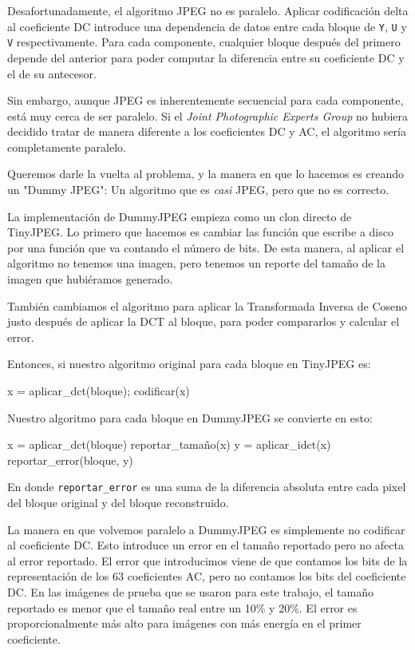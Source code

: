 Desafortunadamente, el algoritmo JPEG no es paralelo. Aplicar codificación
delta al coeficiente DC introduce una dependencia de datos entre cada bloque de
\verb+Y+, \verb+U+ y \verb+V+ respectivamente. Para cada componente, cualquier
bloque después del primero depende del anterior para poder computar la
diferencia entre su coeficiente DC  y el de su antecesor.

Sin embargo, aunque JPEG es inherentemente secuencial para cada componente,
está muy cerca de ser paralelo. Si el \emph{Joint Photographic Experts Group}
no hubiera decidido tratar de manera diferente a los coeficientes DC y AC, el
algoritmo sería completamente paralelo.

Queremos darle la vuelta al problema, y la manera en que lo hacemos es creando un "Dummy JPEG": Un algoritmo que es \emph{casi} JPEG, pero que no es correcto.

La implementación de DummyJPEG empieza como un clon directo de TinyJPEG. Lo
primero que hacemos es cambiar las función que escribe a disco por una función
que va contando el número de bits. De esta manera, al aplicar el algoritmo no
tenemos una imagen, pero tenemos un reporte del tamaño de la imagen que
hubiéramos generado.

También cambiamos el algoritmo para aplicar la Transformada Inversa de Coseno
justo después de aplicar la DCT al bloque, para poder compararlos y calcular el
error.

Entonces, si nuestro algoritmo original para cada bloque en TinyJPEG es:

\begin{code}
    x = aplicar_dct(bloque);
    codificar(x)
\end{code}

Nuestro algoritmo para cada bloque en DummyJPEG se convierte en esto:

\begin{code}
    x = aplicar_dct(bloque)
    reportar_tamaño(x)
    y = aplicar_idct(x)
    reportar_error(bloque, y)
\end{code}

En donde \verb+reportar_error+ es una suma de la diferencia absoluta entre cada pixel del bloque original y del bloque reconstruido.

La manera en que volvemos paralelo a DummyJPEG es simplemente no codificar al
coeficiente DC. Esto introduce un error en el tamaño reportado pero no afecta
al error reportado. El error que introducimos viene de que contamos los bits de
la representación de los 63 coeficientes AC, pero no contamos los bits del
coeficiente DC. En las imágenes de prueba que se usaron para este trabajo, el
tamaño reportado es menor que el tamaño real entre un 10\% y 20\%. El error es
proporcionalmente más alto para imágenes con más energía en el primer
coeficiente.

